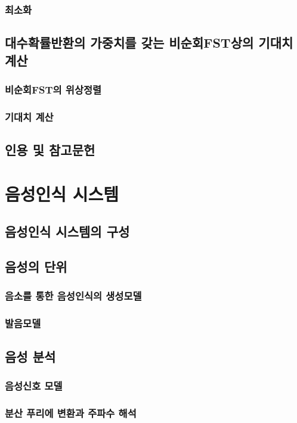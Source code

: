 \documentclass{book}
\begin{document}
\subsection{최소화}
\section{대수확률반환의 가중치를 갖는 비순회FST상의 기대치 계산}
\subsection{비순회FST의 위상정렬}
\subsection{기대치 계산}
\section*{인용 및 참고문헌}

\chapter{음성인식 시스템}
\section{음성인식 시스템의 구성}
\section{음성의 단위}
\subsection{음소를 통한 음성인식의 생성모델}
\subsection{발음모델}
\label{subsec:pronunciation-model}

\section{음성 분석}
\subsection{음성신호 모델}
\subsection{분산 푸리에 변환과 주파수 해석}
\end{document}

